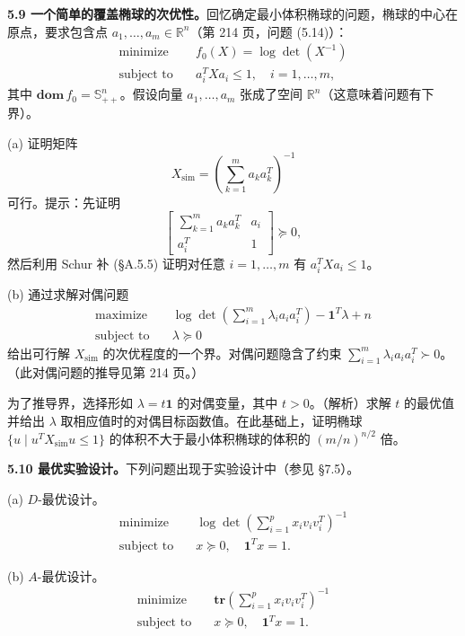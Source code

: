 \documentclass[UTF8,12pt,a4paper,fontset=fandol]{ctexart}
\begin{document}
\noindent\textbf{5.9 一个简单的覆盖椭球的次优性。}\quad 回忆确定最小体积椭球的问题，椭球的中心在原点，要求包含点 $a_1,\ldots,a_m\in\mathbb{R}^n$（第 214 页，问题 (5.14)）：
\[
\begin{aligned}
\text{minimize}\quad & f_0(X)=\log\det(X^{-1})\\
\text{subject to}\quad & a_i^TXa_i\leq 1,\quad i=1,\ldots,m,
\end{aligned}
\]
其中 $\mathbf{dom}\,f_0=\mathbb{S}_{++}^n$。假设向量 $a_1,\ldots,a_m$ 张成了空间 $\mathbb{R}^n$（这意味着问题有下界）。

(a) 证明矩阵
\[
X_{\mathrm{sim}}=\left(\sum_{k=1}^m a_ka_k^T\right)^{-1}
\]
可行。提示：先证明
\[
\begin{bmatrix}
\sum_{k=1}^m a_ka_k^T & a_i\\
a_i^T & 1
\end{bmatrix}\succeq 0,
\]
然后利用 Schur 补 (§A.5.5) 证明对任意 $i=1,\ldots,m$ 有 $a_i^TXa_i\leq 1$。

(b) 通过求解对偶问题
\[
\begin{aligned}
\text{maximize}\quad & \log\det\left(\sum_{i=1}^m\lambda_i a_ia_i^T\right)-\mathbf{1}^T\lambda+n\\
\text{subject to}\quad & \lambda\succeq 0
\end{aligned}
\]
给出可行解 $X_{\mathrm{sim}}$ 的次优程度的一个界。对偶问题隐含了约束 $\sum_{i=1}^m\lambda_i a_ia_i^T\succ 0$。（此对偶问题的推导见第 214 页。）

为了推导界，选择形如 $\lambda=t\mathbf{1}$ 的对偶变量，其中 $t>0$。（解析）求解 $t$ 的最优值并给出 $\lambda$ 取相应值时的对偶目标函数值。在此基础上，证明椭球 $\{u\mid u^TX_{\mathrm{sim}}u\leq 1\}$ 的体积不大于最小体积椭球的体积的 $(m/n)^{n/2}$ 倍。

\noindent\textbf{5.10 最优实验设计。}\quad 下列问题出现于实验设计中（参见 §7.5）。

(a) $D$-最优设计。
\[
\begin{aligned}
\text{minimize}\quad & \log\det\left(\sum_{i=1}^p x_iv_iv_i^T\right)^{-1}\\
\text{subject to}\quad & x\succeq 0,\quad \mathbf{1}^Tx=1.
\end{aligned}
\]

(b) $A$-最优设计。
\[
\begin{aligned}
\text{minimize}\quad & \mathbf{tr}\left(\sum_{i=1}^p x_iv_iv_i^T\right)^{-1}\\
\text{subject to}\quad & x\succeq 0,\quad \mathbf{1}^Tx=1.
\end{aligned}
\]
\end{document}
